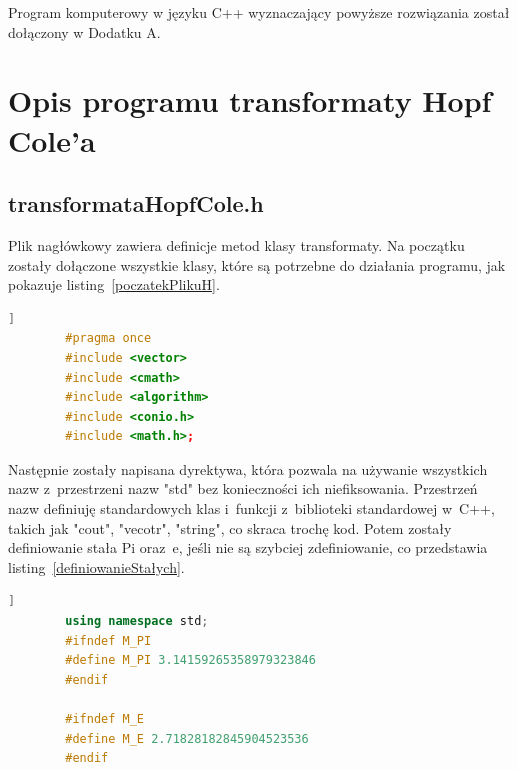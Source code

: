 \documentclass[a4paper,12pt]{article}
\begin{document}
Program komputerowy w języku C++ wyznaczający powyższe rozwiązania został dołączony w Dodatku A.

	\section{Opis programu transformaty Hopf Cole'a}
	\subsection{transformataHopfCole.h}
	Plik nagłówkowy zawiera definicje metod klasy transformaty. Na początku zostały dołączone wszystkie klasy, które są potrzebne do działania programu, jak pokazuje listing~\ref{poczatekPlikuH}.
		\begin{lstlisting}[caption={początek pliku transformataHopfCole.h},label={poczatekPlikuH}, language=C++]]
		#pragma once
		#include <vector>
		#include <cmath>
		#include <algorithm>
		#include <conio.h>
		#include <math.h>;\end{lstlisting}
	Następnie zostały napisana dyrektywa, która pozwala na używanie wszystkich nazw z~przestrzeni nazw "std" bez konieczności ich niefiksowania. Przestrzeń nazw definiuję standardowych klas i~funkcji z~biblioteki standardowej w~C++, takich jak "cout", "vecotr", "string", co skraca trochę kod. Potem zostały definiowanie stała Pi oraz~e, jeśli nie są szybciej zdefiniowanie, co przedstawia listing~\ref{definiowanieStałych}. 
	\begin{lstlisting}[caption={początek pliku definiowanieStałych},label={zdefiniowanie stałych}, language=C++]]
		using namespace std;
		#ifndef M_PI
		#define M_PI 3.14159265358979323846
		#endif
		
		#ifndef M_E
		#define M_E 2.71828182845904523536
		#endif\end{lstlisting}
		
\end{document}
